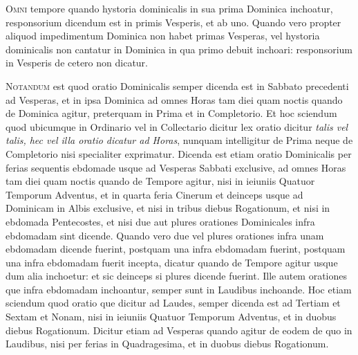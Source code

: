 \begin{multicols*}{2}
{\color{Red} }
\lettrine[lines=2]{\zallmancaps \color{Red} O}{mni} tempore quando hystoria dominicalis in sua prima Dominica inchoatur, responsorium dicendum est in primis Vesperis, et ab uno. Quando vero propter aliquod impedimentum Dominica non habet primas Vesperas, vel hystoria dominicalis non cantatur in Dominica in qua primo debuit inchoari: responsorium in Vesperis de cetero non dicatur.

{\color{Red} }
\lettrine[lines=2]{\zallmancaps \color{Blue} N}{otandum} est quod oratio Dominicalis semper dicenda est in Sabbato precedenti ad Vesperas, et in ipsa Dominica ad omnes Horas tam diei quam noctis quando de Dominica agitur, preterquam in Prima et in Completorio. Et hoc sciendum quod ubicumque in Ordinario vel in Collectario dicitur lex oratio dicitur \textit{talis vel talis, hec vel illa oratio dicatur ad Horas}, nunquam intelligitur de Prima neque de Completorio nisi specialiter exprimatur. Dicenda est etiam oratio Dominicalis per ferias sequentis ebdomade usque ad Vesperas Sabbati exclusive, ad omnes Horas tam diei quam noctis quando de Tempore agitur, nisi in ieiuniis Quatuor Temporum Adventus, et in quarta feria Cinerum et deinceps usque ad Dominicam in Albis exclusive, et nisi in tribus diebus Rogationum, et nisi in ebdomada Pentecostes, et nisi due aut plures orationes Dominicales infra ebdomadam sint dicende. Quando vero due vel plures orationes infra unam ebdomadam dicende fuerint, postquam una infra ebdomadam fuerint, postquam una infra ebdomadam fuerit incepta, dicatur quando de Tempore agitur usque dum alia inchoetur: et sic deinceps si plures dicende fuerint.
Ille autem orationes que infra ebdomadam inchoantur, semper sunt in Laudibus inchoande. Hoc etiam sciendum quod oratio que dicitur ad Laudes, semper dicenda est ad Tertiam et Sextam et Nonam, nisi in ieiuniis Quatuor Temporum Adventus, et in duobus diebus Rogationum. Dicitur etiam ad Vesperas quando agitur de eodem de quo in Laudibus, nisi per ferias in Quadragesima, et in duobus diebus Rogationum.


\end{multicols*}
